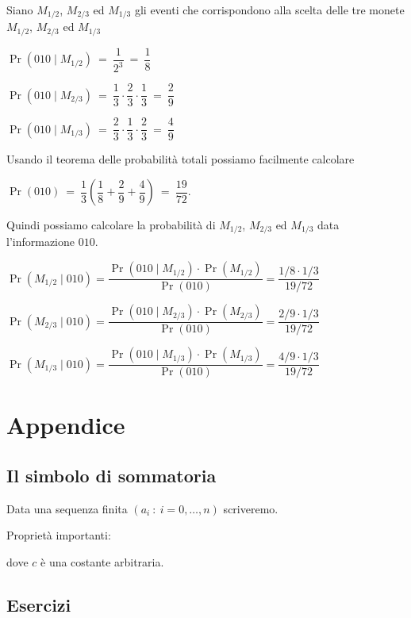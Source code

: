 \documentclass[12pt,openany]{book}
\theoremstyle{mio}
\theoremstyle{liscio}
\begin{document}
Siano $M_{1/2}$, $M_{2/3}$ ed $M_{1/3}$ gli eventi che corrispondono alla scelta delle tre monete
$M_{1/2}$, $M_{2/3}$ ed $M_{1/3}$

$\Pr(010\mathrel|M_{1/2})\ =\ \dfrac{1}{2^3}\ =\ \dfrac{1}{8}$

$\Pr(010\mathrel|M_{2/3})\ =\ \dfrac{1}{3}\cdot\dfrac{2}{3}\cdot\dfrac{1}{3}\ =\ \dfrac{2}{9}$

$\Pr(010\mathrel|M_{1/3})\ =\ \dfrac{2}{3}\cdot\dfrac{1}{3}\cdot\dfrac{2}{3}\ =\ \dfrac{4}{9}$

\smallskip
Usando il teorema delle probabilità totali possiamo facilmente calcolare 

$\Pr(010)\ =\ \dfrac{1}{3}\left(\dfrac{1}{8}+\dfrac{2}{9}+\dfrac{4}{9}\right)\ =\ \dfrac{19}{72}$.

Quindi possiamo calcolare la probabilità di $M_{1/2}$, $M_{2/3}$ ed $M_{1/3}$ data l'informazione $010$.

$\Pr(M_{1/2} \mathrel| 010)=\dfrac{\Pr(010\mathrel|M_{1/2})\cdot \Pr(M_{1/2})}{\Pr(010)}=\dfrac{1/8\cdot 1/3}{19/72}$

$\Pr(M_{2/3} \mathrel| 010)=\dfrac{\Pr(010\mathrel|M_{2/3})\cdot \Pr(M_{2/3})}{\Pr(010)}=\dfrac{2/9\cdot 1/3}{19/72}$

$\Pr(M_{1/3} \mathrel| 010)=\dfrac{\Pr(010\mathrel|M_{1/3})\cdot \Pr(M_{1/3})}{\Pr(010)}=\dfrac{4/9\cdot 1/3}{19/72}$


\chapter{Appendice}

\section{Il simbolo di sommatoria}

Data una sequenza finita $(a_i\ :\ i=0,\dots,n)$ scriveremo.


\par\medskip
Propriet\`a importanti:

\hfill dove $c$ \`e una costante arbitraria.




\clearpage\section{Esercizi}
\end{document}
